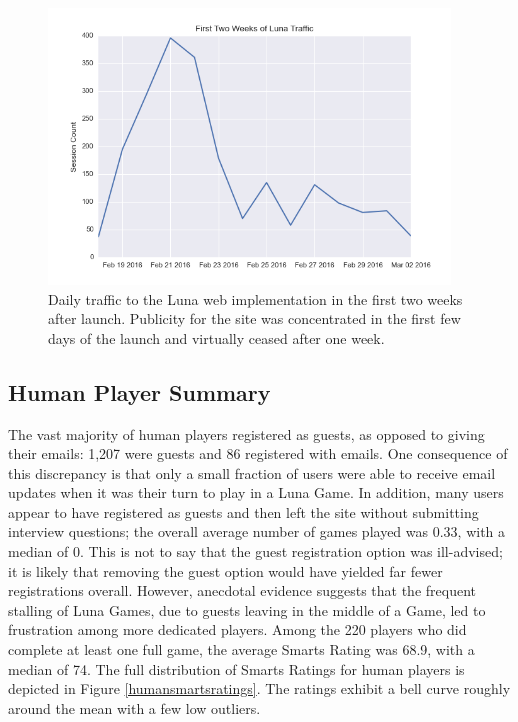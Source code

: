 \begin{figure}
\includegraphics[width=0.95\textwidth]{figures/trafficPlot.png}
\caption{Daily traffic to the Luna web implementation in the first two weeks after launch. Publicity for the site was concentrated in the first few days of the launch and virtually ceased after one week.}
\label{trafficplot}
\end{figure}

\subsection{Human Player Summary}

The vast majority of human players registered as guests, as opposed to giving their emails: 1,207 were guests and 86 registered with emails. One consequence of this discrepancy is that only a small fraction of users were able to receive email updates when it was their turn to play in a Luna Game. In addition, many users appear to have registered as guests and then left the site without submitting interview questions; the overall average number of games played was 0.33, with a median of 0. This is not to say that the guest registration option was ill-advised; it is likely that removing the guest option would have yielded far fewer registrations overall. However, anecdotal evidence suggests that the frequent stalling of Luna Games, due to guests leaving in the middle of a Game, led to frustration among more dedicated players. Among the 220 players who did complete at least one full game, the average Smarts Rating was 68.9, with a median of 74. The full distribution of Smarts Ratings for human players is depicted in Figure \ref{humansmartsratings}. The ratings exhibit a bell curve roughly around the mean with a few low outliers. 

